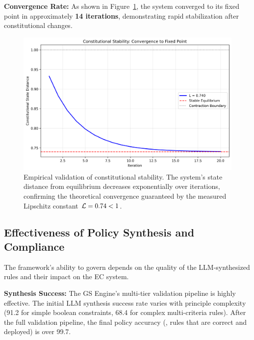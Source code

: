 \textbf{Convergence Rate:} As shown in Figure~\ref{fig:stability_analysis}, the system converged to its fixed point in approximately \textbf{14 iterations}, demonstrating rapid stabilization after constitutional changes.

\begin{figure}[H]
    \centering
    \includegraphics[width=\linewidth]{stability_analysis.png}
    \caption{Empirical validation of constitutional stability. The system's state distance from equilibrium decreases exponentially over iterations, confirming the theoretical convergence guaranteed by the measured Lipschitz constant $\lipschitz = 0.74 < 1$.}\label{fig:stability_analysis}
\end{figure}

\subsection{Effectiveness of Policy Synthesis and Compliance}
The framework's ability to govern depends on the quality of the LLM-synthesized rules and their impact on the EC system.

\textbf{Synthesis Success:} The GS Engine's multi-tier validation pipeline is highly effective. The initial LLM synthesis success rate varies with principle complexity (91.2\percent{} for simple boolean constraints, 68.4\percent{} for complex multi-criteria rules). After the full validation pipeline, the final policy accuracy (\ie{}, rules that are correct and deployed) is over 99.7\percent{}.

